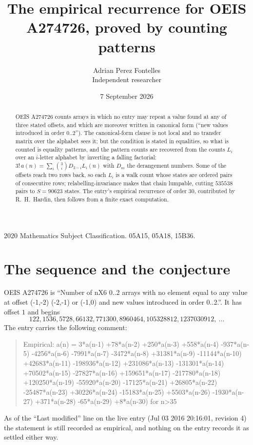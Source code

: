 \documentclass[11pt,a4paper]{article}
\title{The empirical recurrence for OEIS A274726, proved by counting patterns}
\author{Adrian Perez Fontelles\\ \small Independent researcher}
\date{7 September 2026}
\theoremstyle{plain}
\theoremstyle{definition}
\begin{document}
\maketitle

\begin{abstract}
OEIS A274726 counts arrays in which no entry may repeat a value found at any of three stated
offsets, and which are moreover written in canonical form (``new values introduced in order
$0..2$''). The canonical-form clause is not local and no transfer matrix over the
alphabet sees it; but the condition is stated in equalities, so what is counted is equality
patterns, and the pattern counts are recovered from the counts $L_i$ over an $i$-letter
alphabet by inverting a falling factorial:
$3!\,a(n)=\sum_i\binom{3}{i}D_{3-i}L_i(n)$ with $D_m$ the derangement numbers.
Some of the offsets reach two rows back, so each $L_i$ is a walk count whose states are
ordered pairs of consecutive rows; relabelling-invariance makes that chain lumpable,
cutting $535538$ pairs to $S=90623$ states. The entry's empirical recurrence of order $30$,
contributed by R.~H.~Hardin, then follows from a finite exact computation.
\end{abstract}

\noindent\small 2020 Mathematics Subject Classification. 05A15, 05A18, 15B36.\normalsize

\section{The sequence and the conjecture}

OEIS A274726 is ``Number of nX6 0..2 arrays with no element equal to any value at offset (-1,-2) (-2,-1) or (-1,0) and new values introduced in order 0..2.''. It has offset $1$ and begins
\[
122, 1536, 5728, 66132, 771300, 8960464, 105328812, 1237030912,\ \dots
\]
The entry carries the following comment:
\begin{quote}\small
Empirical: a(n) = 3*a(n-1) +78*a(n-2) +250*a(n-3) +558*a(n-4) -937*a(n-5) -4256*a(n-6) -7991*a(n-7) -3472*a(n-8) +31381*a(n-9) -11144*a(n-10) +42683*a(n-11) -198936*a(n-12) +231086*a(n-13) -131301*a(n-14) +70502*a(n-15) -27827*a(n-16) +159651*a(n-17) -217780*a(n-18) +120250*a(n-19) -55920*a(n-20) -17125*a(n-21) +26805*a(n-22) -25487*a(n-23) +30226*a(n-24) -15183*a(n-25) +5503*a(n-26) -1930*a(n-27) +371*a(n-28) -65*a(n-29) +8*a(n-30) for n>35
\end{quote}
As of the ``Last modified'' line on the live entry (Jul 03 2016 20:16:01, revision 4) the statement is
still recorded as empirical, and nothing on the entry records it as settled either way.
\end{document}
